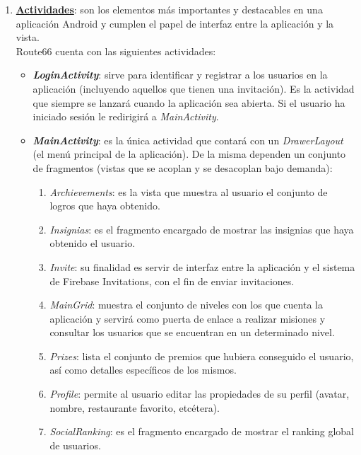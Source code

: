 \documentclass[twoside]{report}
\begin{document}
\begin{enumerate}
\item \textbf{\underline{Actividades}}: son los elementos más importantes y destacables en una aplicación Android y cumplen el papel de interfaz entre la aplicación y la vista.\\
Route66 cuenta con las siguientes actividades:

	\begin{itemize}
	\item \textbf{\textit{LoginActivity}}: sirve para identificar y registrar a los usuarios en la aplicación (incluyendo aquellos que tienen una invitación). Es la actividad que siempre se lanzará cuando la aplicación sea abierta. Si el usuario ha iniciado sesión le redirigirá  a \textit{MainActivity}.
	
	\item \textbf{\textit{MainActivity}}: es la única actividad que contará con un \textit{DrawerLayout} (el menú principal de la aplicación). De la misma dependen un conjunto de fragmentos (vistas que se acoplan y se desacoplan bajo demanda):
	
		\begin{enumerate}
			\item \textit{Archievements}: es la vista que muestra al usuario el conjunto de logros que haya obtenido.
			
			\item \textit{Insignias}: es el fragmento encargado de mostrar las insignias que haya obtenido el usuario.
			
			\item \textit{Invite}: su finalidad es servir de interfaz entre la aplicación y el sistema de Firebase Invitations, con el fin de enviar invitaciones.
			
			\item \textit{MainGrid}: muestra el conjunto de niveles con los que cuenta la aplicación y servirá como puerta de enlace a realizar misiones y consultar los usuarios que se encuentran en un determinado nivel.
			
			\item \textit{Prizes}: lista el conjunto de premios que hubiera conseguido el usuario, así como detalles específicos de los mismos.
			
			\item \textit{Profile}: permite al usuario editar las propiedades de su perfil (avatar, nombre, restaurante favorito, etcétera).
			
			\item \textit{SocialRanking}: es el fragmento encargado de mostrar el ranking global de usuarios.
			

\end{enumerate}
\end{itemize}
\end{enumerate}
\end{document}
